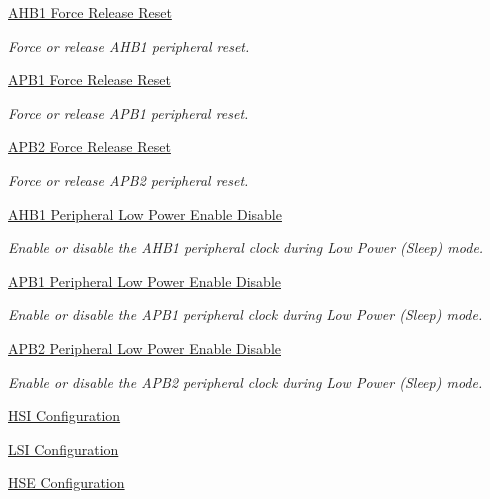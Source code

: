 \begin{DoxyCompactItemize}
\hyperlink{group___r_c_c___a_h_b1___force___release___reset}{A\+H\+B1 Force Release Reset}
\begin{DoxyCompactList}\small\item\em Force or release A\+H\+B1 peripheral reset. \end{DoxyCompactList}\item 
\hyperlink{group___r_c_c___a_p_b1___force___release___reset}{A\+P\+B1 Force Release Reset}
\begin{DoxyCompactList}\small\item\em Force or release A\+P\+B1 peripheral reset. \end{DoxyCompactList}\item 
\hyperlink{group___r_c_c___a_p_b2___force___release___reset}{A\+P\+B2 Force Release Reset}
\begin{DoxyCompactList}\small\item\em Force or release A\+P\+B2 peripheral reset. \end{DoxyCompactList}\item 
\hyperlink{group___r_c_c___a_h_b1___low_power___enable___disable}{A\+H\+B1 Peripheral Low Power Enable Disable}
\begin{DoxyCompactList}\small\item\em Enable or disable the A\+H\+B1 peripheral clock during Low Power (Sleep) mode. \end{DoxyCompactList}\item 
\hyperlink{group___r_c_c___a_p_b1___low_power___enable___disable}{A\+P\+B1 Peripheral Low Power Enable Disable}
\begin{DoxyCompactList}\small\item\em Enable or disable the A\+P\+B1 peripheral clock during Low Power (Sleep) mode. \end{DoxyCompactList}\item 
\hyperlink{group___r_c_c___a_p_b2___low_power___enable___disable}{A\+P\+B2 Peripheral Low Power Enable Disable}
\begin{DoxyCompactList}\small\item\em Enable or disable the A\+P\+B2 peripheral clock during Low Power (Sleep) mode. \end{DoxyCompactList}\item 
\hyperlink{group___r_c_c___h_s_i___configuration}{H\+S\+I Configuration}
\item 
\hyperlink{group___r_c_c___l_s_i___configuration}{L\+S\+I Configuration}
\item 
\hyperlink{group___r_c_c___h_s_e___configuration}{H\+S\+E Configuration}

\end{DoxyCompactItemize}
